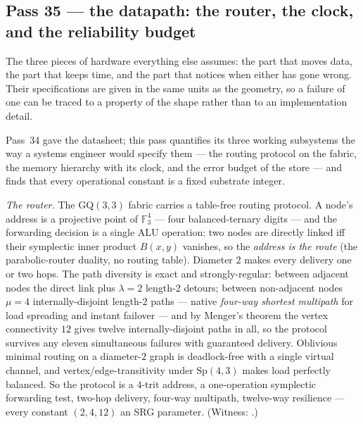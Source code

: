 \documentclass[11pt]{article}
\begin{document}
\subsection{Pass 35 --- the datapath: the router, the clock, and the reliability budget}

\begin{plainbox}
The three pieces of hardware everything else assumes: the part that moves data, the
part that keeps time, and the part that notices when either has gone wrong. Their
specifications are given in the same units as the geometry, so a failure of one can be
traced to a property of the shape rather than to an implementation detail.
\end{plainbox}

\label{sec:capstone-thirtyfive}

Pass~34 gave the datasheet; this pass quantifies its three working subsystems the way a systems
engineer would specify them --- the routing protocol on the fabric, the memory hierarchy with its
clock, and the error budget of the store --- and finds that every operational constant is a fixed
substrate integer.

\emph{The router.} The $\mathrm{GQ}(3,3)$ fabric carries a table-free routing protocol. A node's
address is a projective point of $\mathbb{F}_3^4$ --- four balanced-ternary digits --- and the
forwarding decision is a single ALU operation: two nodes are directly linked iff their symplectic
inner product $B(x,y)$ vanishes, so the \emph{address is the route} (the parabolic-router duality, no
routing table). Diameter $2$ makes every delivery one or two hops. The path diversity is exact and
strongly-regular: between adjacent nodes the direct link plus $\lambda=2$ length-$2$ detours; between
non-adjacent nodes $\mu=4$ internally-disjoint length-$2$ paths --- native \emph{four-way shortest
multipath} for load spreading and instant failover --- and by Menger's theorem the vertex
connectivity $12$ gives twelve internally-disjoint paths in all, so the protocol survives any eleven
simultaneous failures with guaranteed delivery. Oblivious minimal routing on a diameter-$2$ graph is
deadlock-free with a single virtual channel, and vertex/edge-transitivity under $\mathrm{Sp}(4,3)$
makes load perfectly balanced. So the protocol is a $4$-trit address, a one-operation symplectic
forwarding test, two-hop delivery, four-way multipath, twelve-way resilience --- every constant
$(2,4,12)$ an SRG parameter. (Witness: .)
\end{document}
